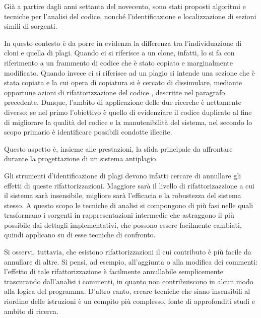 Già a partire dagli anni settanta del novecento, sono stati proposti algoritmi e tecniche per l'analisi del codice, nonché l'identificazione e localizzazione di sezioni simili di sorgenti.

In questo contesto è da porre in evidenza la differenza tra l'individuazione di cloni e quella di plagi.
%
Quando ci si riferisce a un clone, infatti, lo si fa con riferimento a un frammento di codice che è stato copiato e marginalmente modificato. 
%
Quando invece ci si riferisce ad un plagio si intende una sezione che è stata copiata e la cui opera di copiatura si è cercato di dissimulare, mediante opportune azioni di rifattorizzazione del codice \cite{cpdp}, descritte nel paragrafo precedente.
%
Dunque, l'ambito di applicazione delle due ricerche è nettamente diverso: se nel primo l'obiettivo è quello di evidenziare il codice duplicato al fine di migliorare la qualità del codice e la manutenibilità del sistema, nel secondo lo scopo primario è identificare possibili condotte illecite.

Questo aspetto è, insieme alle prestazioni, la sfida principale da affrontare durante la progettazione di un sistema antiplagio.

Gli strumenti d'identificazione di plagi devono infatti cercare di annullare gli effetti di queste rifattorizzazioni.
%
Maggiore sarà il livello di rifattorizazzione a cui il sistema sarà insensibile, migliore sarà l'efficacia e la robustezza del sistema stesso.
%
A questo scopo le tecniche di analisi si compongono di più fasi nelle quali trasformano i sorgenti in rappresentazioni intermedie che astraggono il più possibile dai dettagli implementativi, che possono essere facilmente cambiati, quindi applicano su di esse tecniche di confronto.

Si osservi, tuttavia, che esistono rifattorizzazioni il cui contributo è più facile da annullare di altre. 
%
Si pensi, ad esempio, all'aggiunta o alla modifica dei commenti: l'effetto di tale rifattorizzazione è facilmente annullabile semplicemente trascurando dall'analisi i commenti, in quanto non contribuiscono in alcun modo alla logica del programma. 
%
D'altro canto, creare tecniche che siano insensibili al riordino delle istruzioni è un compito più complesso, fonte di approfonditi studi e ambito di ricerca.

